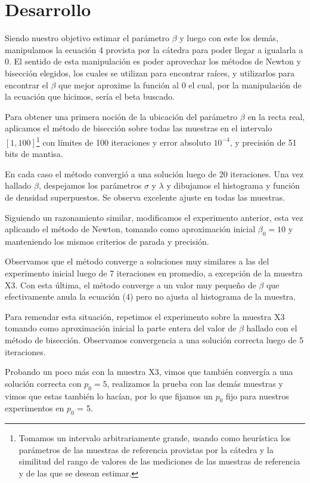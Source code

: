 \documentclass[a4paper,10pt,twoside]{article}
\begin{document}
\section{Desarrollo}
Siendo nuestro objetivo estimar el parámetro $\beta$ y luego con este los demás, manipulamos la ecuación 4 provista por la cátedra para poder llegar a igualarla a 0. El sentido de esta manipulación es poder aprovechar los métodos de Newton y bisección elegidos, los cuales se utilizan para encontrar raíces, y utilizarlos para encontrar el $\beta$ que mejor aproxime la función al 0 el cual, por la manipulación de la ecuación que hicimos, sería el beta buscado.

Para obtener una primera noción de la ubicación del parámetro $\beta$ en la
recta real, aplicamos el método de bisección sobre todas las muestras en el
intervalo $[1, 100]$\footnote{Tomamos un intervalo arbitrariamente grande,
usando como heurística los parámetros de las muestras de referencia provistas
por la cátedra y la similitud del rango de valores de las mediciones de las
muestras de referencia y de las que se desean estimar.} con límites de 100
iteraciones y error absoluto $10^{-4}$, y precisión de 51 bits de mantisa.

En cada caso el método convergió a una solución luego de 20 iteraciones.
Una vez hallado $\beta$, despejamos los parámetros $\sigma$ y $\lambda$ y
dibujamos el histograma y función de densidad superpuestos. Se observa
excelente ajuste en todas las muestras.

Siguiendo un razonamiento similar, modificamos el experimento anterior,
esta vez aplicando el método de Newton, tomando como aproximación inicial
$\beta_0 = 10$ y manteniendo los mismos criterios de parada y precisión.

Observamos que el método converge a soluciones muy similares a las del
experimento inicial luego de 7 iteraciones en promedio, a excepción de la
muestra X3. Con esta última, el método converge a un valor muy pequeño de
$\beta$ que efectivamente anula la ecuación (4) pero no ajusta al histograma
de la muestra.

Para remendar esta situación, repetimos el experimento sobre la muestra X3
tomando como aproximación inicial la parte entera del valor de $\beta$ hallado
con el método de bisección. Observamos convergencia a una solución correcta
luego de 5 iteraciones.

Probando un poco más con la muestra X3, vimos que también convergía a una solución correcta con $p_0 = 5$, realizamos la prueba con las demás muestras y vimos que estas también lo hacían, por lo que fijamos un $p_0$ fijo para nuestros experimentos en $p_0$ = 5.
\end{document}
